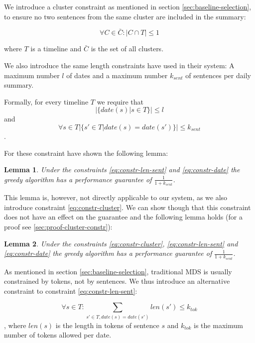 \documentclass[a4paper,BCOR=10mm]{report}
\newtheorem{lemma}{Lemma}
\numberwithin{lemma}{chapter}
\numberwithin{definition}{chapter}
\begin{document}
We introduce a cluster constraint as mentioned in section \ref{sec:baseline-selection}, to ensure no two sentences from the same cluster are included in the summary:

\begin{equation}
\forall C \in \bar{C} \label{eq:constr-cluster}: |C \cap T| \leq 1
\end{equation}

where $T$ is a timeline and $\bar{C}$ is the set of all clusters.

We also introduce the same length constraints \citet{markert} have used in their system: A maximum number $l$ of dates and a maximum number $k_{\mathit{sent}}$ of sentences per daily summary. 

Formally, for every timeline $T$ we require that
\begin{equation}
|\{ \mathit{date}(s) | s \in T \}| \leq l \label{eq:constr-date}
\end{equation}
and
\begin{equation}
\forall s \in T |\{ s' \in T | \mathit{date}(s) = \mathit{date}(s') \}| \leq k_{\mathit{sent}} \label{eq:constr-len-sent}
\end{equation}.

For these constraint \citet{markert} have shown the following lemma:
\begin{lemma}
Under the constraints \ref{eq:constr-len-sent} and \ref{eq:constr-date} the greedy algorithm has a performance guarantee of $\frac{1}{1 + k_{\mathit{sent}}}$.
\end{lemma}

This lemma is, however, not directly applicable to our system, as we also introduce constraint \ref{eq:constr-cluster}. We can show though that this constraint does not have an effect on the guarantee and the following lemma holds (for a proof see \ref{sec:proof-cluster-constr}):
\begin{lemma}
Under the constraints \ref{eq:constr-cluster}, \ref{eq:constr-len-sent} and \ref{eq:constr-date} the greedy algorithm has a performance guarantee of $\frac{1}{1 + k_{\mathit{sent}}}$.
\end{lemma}

As mentioned in section \ref{sec:baseline-selection}, traditional MDS is usually constrained by tokens, not by sentences.
We thus introduce an alternative constraint to constraint \ref{eq:constr-len-sent}:

\begin{equation}
\forall s \in T: \sum_{s' \in T, \mathit{date}(s) = \mathit{date}(s')} \mathit{len}(s') \leq k_{\mathit{tok}} \label{eq:contr-len-tok}
\end{equation},
where $\mathit{len}(s)$ is the length in tokens of sentence $s$ and $k_{\mathit{tok}}$ is the maximum number of tokens allowed per date.
\end{document}
